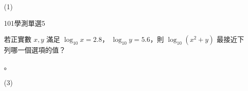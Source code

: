 \begin{QUESTIONS}
\begin{QUESTION}
\begin{QBODY}
        \end{QBODY}
        \begin{QFROMS}
        \end{QFROMS}
        \begin{QTAGS}\end{QTAGS}
        \begin{QANS}
            (1)
        \end{QANS}
        \begin{QSOLLIST}
        \end{QSOLLIST}
        \begin{QEMPTYSPACE}
        \end{QEMPTYSPACE}
    \end{QUESTION}
    \begin{QUESTION}
        \begin{ExamInfo}{101}{學測}{單選}{5}
        \end{ExamInfo}
        \begin{ExamAnsRateInfo}{51}{91}{46}{16}
        \end{ExamAnsRateInfo}
        \begin{QBODY}
            若正實數 $x, y$ 滿足 $\log_{10} x =2.8  $， $\log_{10} y = 5.6$，則 $\log_{10} ( x^2 + y)$ 最接近下列哪一個選項的值？
			\begin{QOPS} 
				 。
			\end{QOPS}
        \end{QBODY}
        \begin{QFROMS}
        \end{QFROMS}
        \begin{QTAGS}\end{QTAGS}
        \begin{QANS}
            (3)
        \end{QANS}
        \begin{QSOLLIST}
        \end{QSOLLIST}
        \begin{QEMPTYSPACE}
        \end{QEMPTYSPACE}
    \end{QUESTION}

\end{QUESTIONS}
